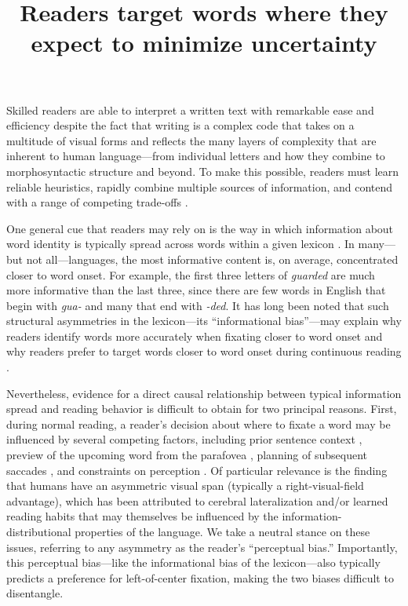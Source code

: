 \documentclass[doc,biblatex,floatsintext]{apa7}
\title{Readers target words where they expect to minimize uncertainty}
\begin{document}
\maketitle

\noindent
Skilled readers are able to interpret a written text with remarkable ease and efficiency despite the fact that writing is a complex code that takes on a multitude of visual forms and reflects the many layers of complexity that are inherent to human language---from individual letters and how they combine to morphosyntactic structure and beyond. To make this possible, readers must learn reliable heuristics, rapidly combine multiple sources of information, and contend with a range of competing trade-offs \parencite{Rayner:1998, Yeatman:2021, Snowling:2022}.

One general cue that readers may rely on is the way in which information about word identity is typically spread across words within a given lexicon \parencite{Farid:1996, Clark:1999, Deutsch:1999, Alhama:2019, Shafir:2022}. In many---but not all---languages, the most informative content is, on average, concentrated closer to word onset. For example, the first three letters of \textit{guarded} are much more informative than the last three, since there are few words in English that begin with \textit{gua-} and many that end with \textit{-ded}. It has long been noted that such structural asymmetries in the lexicon---its ``informational bias''---may explain why readers identify words more accurately when fixating closer to word onset \parencite[the optimal viewing position;][]{ORegan:1984, Brysbaert:2005, Hyona:2011} and why readers prefer to target words closer to word onset during continuous reading \parencite[the preferred landing position;][]{McConkie:1988, Vitu:1990, Ducrot:2002}.

Nevertheless, evidence for a direct causal relationship between typical information spread and reading behavior is difficult to obtain for two principal reasons. First, during normal reading, a reader's decision about where to fixate a word may be influenced by several competing factors, including prior sentence context \parencite{Balota:1985}, preview of the upcoming word from the parafovea \parencite{Hyona:1989, Underwood:1990, Schotter:2011}, planning of subsequent saccades \parencite{McDonald:2004}, and constraints on perception \parencite{Bouma:1973, McConkie:1975}. Of particular relevance is the finding that humans have an asymmetric visual span (typically a right-visual-field advantage), which has been attributed to cerebral lateralization \parencite{Brysbaert:1988, Bub:1988, Ellis:2004, VanderHaegen:2013} and/or learned reading habits \parencite{Huey:1900, Mishkin:1952, Pollatsek:1981} that may themselves be influenced by the information-distributional properties of the language. We take a neutral stance on these issues, referring to any asymmetry as the reader's ``perceptual bias.'' Importantly, this perceptual bias---like the informational bias of the lexicon---also typically predicts a preference for left-of-center fixation, making the two biases difficult to disentangle.
\end{document}
